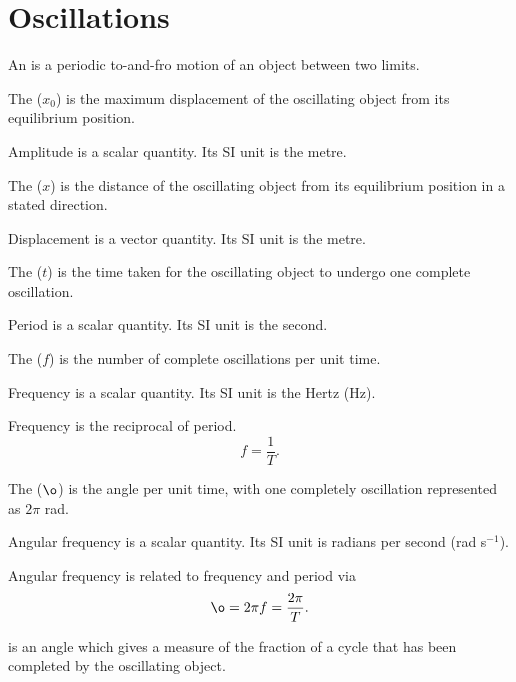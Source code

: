 \chapter{Oscillations}

\begin{definition}
    An  is a periodic to-and-fro motion of an object between two limits.
\end{definition}

\begin{definition}
    The  ($x_0$) is the maximum displacement of the oscillating object from its equilibrium position.
\end{definition}

Amplitude is a scalar quantity. Its SI unit is the metre.

\begin{definition}
    The  ($x$) is the distance of the oscillating object from its equilibrium position in a stated direction.
\end{definition}

Displacement is a vector quantity. Its SI unit is the metre.

\begin{definition}
    The  ($t$) is the time taken for the oscillating object to undergo one complete oscillation.
\end{definition}

Period is a scalar quantity. Its SI unit is the second.

\begin{definition}
    The  ($f$) is the number of complete oscillations per unit time.
\end{definition}

Frequency is a scalar quantity. Its SI unit is the Hertz (Hz).

Frequency is the reciprocal of period. \[f = \frac1T.\]

\begin{definition}
    The  ($\o$) is the angle per unit time, with one completely oscillation represented as $2\pi$ rad.
\end{definition}

Angular frequency is a scalar quantity. Its SI unit is radians per second (rad s$^{-1}$).

Angular frequency is related to frequency and period via \[\o = 2\pi f = \frac{2\pi}{T}.\]

\begin{definition}
     is an angle which gives a measure of the fraction of a cycle that has been completed by the oscillating object.
\end{definition}

